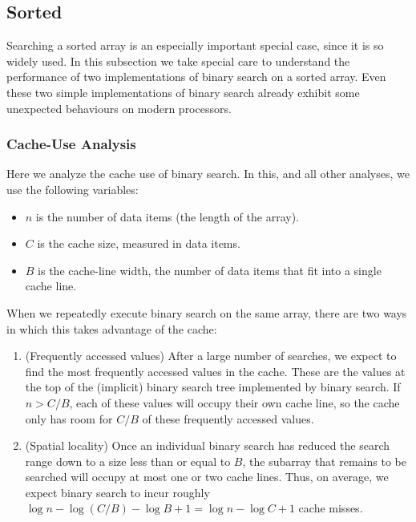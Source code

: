 \documentclass{patmorin}
\begin{document}
\subsection{Sorted}

Searching a sorted array is an especially important special case, since it
is so widely used. In this subsection we take special care to understand
the performance of two implementations of binary search on a sorted array.
Even these two simple implementations of binary search already exhibit
some unexpected behaviours on modern processors.

\subsubsection{Cache-Use Analysis}

Here we analyze the cache use of binary search. In this, and all other
analyses, we use the following variables:

\begin{itemize}
  \item $n$ is the number of data items (the length of the array).
  \item $C$ is the cache size, measured in data items.
  \item $B$ is the cache-line width, the number of data items that fit
        into a single cache line.
\end{itemize}

When we repeatedly execute binary search on the same array, there are
two ways in which this takes advantage of the cache:

\begin{enumerate}
  \item (Frequently accessed values) After a large number of searches,
    we expect to find the most frequently accessed values in the cache.
    These are the values at the top of the (implicit) binary search tree
    implemented by binary search.  If $n>C/B$, each of these values will
    occupy their own cache line, so the cache only has room for $C/B$
    of these frequently accessed values.
  \item (Spatial locality) Once an individual binary search has reduced
    the search range down to a size less than or equal to $B$, the
    subarray that remains to be searched will occupy at most one or two
    cache lines. Thus, on average, we expect binary search to incur
    roughly $\log n -\log(C/B) - \log B + 1 = \log n - \log C + 1$
    cache misses.
\end{enumerate}
\end{document}
